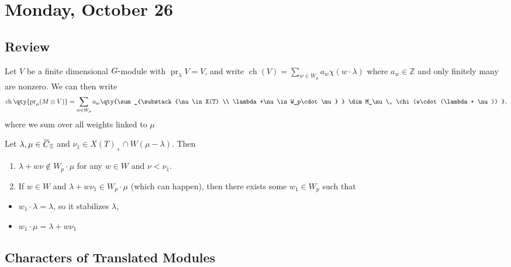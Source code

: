 \hypertarget{monday-october-26}{%
\section{Monday, October 26}\label{monday-october-26}}

\hypertarget{review-2}{%
\subsection{Review}\label{review-2}}

Let \(V\) be a finite dimensional \(G{\hbox{-}}\)module with
\({\operatorname{pr}}_\lambda V = V\), and write
\(\operatorname{ch}(V) = \sum_{w\in W_p} a_w \chi(w\cdot \lambda)\)
where \(a_w\in {\mathbb{Z}}\) and only finitely many are nonzero. We can
then write
\begin{align*}  
\operatorname{ch}\qty{{\operatorname{pr}}_\mu(M\otimes V)} = \sum_{w\in W_p} a_w \qty{\sum_{\substack{\nu \in X(T) \\ \lambda+\nu \in W_p\cdot \mu} } \dim M_\nu \, \chi(w\cdot(\lambda + \nu))   }
,\end{align*}
where we sum over all weights linked to \(\mu\)

\begin{lemma}[Technical]

Let
\(\lambda,\mu \in \mkern 1.5mu\overline{\mkern-1.5muC\mkern-1.5mu}\mkern 1.5mu_{\mathbb{Z}}\)
and \(\nu_1 \in X(T)_+ \cap W(\mu-\lambda)\). Then

\begin{enumerate}
\def\labelenumi{\alph{enumi}.}
\item
  \(\lambda + w\nu \not\in W_p\cdot \mu\) for any \(w\in W\) and
  \(\nu < \nu_1\).
\item
  If \(w\in W\) and \(\lambda + w\nu_1 \in W_p \cdot \mu\) (which can
  happen), then there exists some \(w_1\in W_p\) such that
\end{enumerate}

\begin{itemize}
\tightlist
\item
  \(w_1\cdot \lambda = \lambda\), so it stabilizes \(\lambda\),
\item
  \(w_1\cdot \mu = \lambda + w\nu_1\)
\end{itemize}

\end{lemma}

\hypertarget{characters-of-translated-modules}{%
\subsection{Characters of Translated
Modules}\label{characters-of-translated-modules}}

